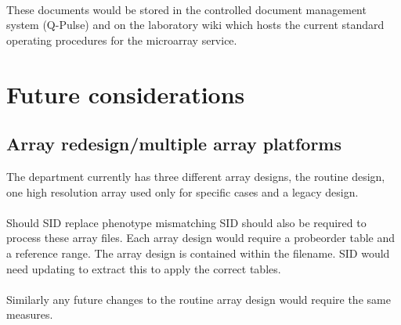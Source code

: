 \paragraph*{}
These documents would be stored in the controlled document management system (Q-Pulse) and on the laboratory wiki which hosts the current standard operating procedures for the microarray service.

\section{Future considerations}
\subsection{Array redesign/multiple array platforms}
The department currently has three different array designs, the routine design, one high resolution array used only for specific cases and a legacy design. 
\paragraph*{}
Should SID replace phenotype mismatching SID should also be required to process these array files. Each array design would require a probeorder table and a reference range. The array design is contained within the filename. SID would need updating to extract this to apply the correct tables.
\paragraph*{}
Similarly any future changes to the routine array design would require the same measures.